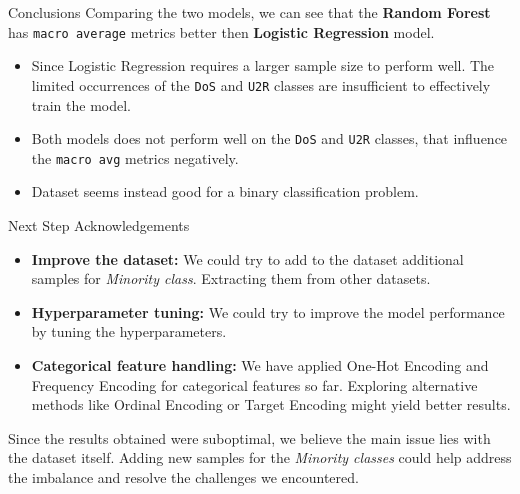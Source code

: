 \documentclass[12pt,aspectratio=169,notheorems]{beamer}
\begin{document}
\begin{frame}{Conclusions}
    Comparing the two models, we can see that the \textbf{Random Forest} has \texttt{macro average} metrics better then \textbf{Logistic Regression} model. \\
    \begin{table}[]
        \end{table}
        \begin{itemize}
            \item Since Logistic Regression requires a larger sample size to perform well. The limited occurrences of the \texttt{DoS} and \texttt{U2R} classes are insufficient to effectively train the model.
            \item Both models does not perform well on the \texttt{DoS} and \texttt{U2R} classes, that influence the \texttt{macro avg} metrics negatively.
            \item Dataset seems instead good for a binary classification problem.
        \end{itemize}
\end{frame}

\begin{frame}{Next Step Acknowledgements}
    \begin{itemize}
        \item \textbf{Improve the dataset:} We could try to add to the dataset additional samples for \emph{Minority class}. Extracting them from other datasets.
        \item \textbf{Hyperparameter tuning:} We could try to improve the model performance by tuning the hyperparameters.
        \item \textbf{Categorical feature handling:} We have applied One-Hot Encoding and Frequency Encoding for categorical features so far. Exploring alternative methods like Ordinal Encoding or Target Encoding might yield better results.
    \end{itemize}
    Since the results obtained were suboptimal, we believe the main issue lies with the dataset itself. Adding new samples for the \emph{Minority classes} could help address the imbalance and resolve the challenges we encountered. 
\end{frame}
\end{document}
